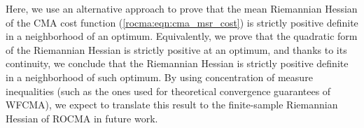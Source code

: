 %
%

Here, we use an alternative approach to prove that the mean Riemannian Hessian of the CMA cost function (\ref{rocma:eqn:cma_msr_cost}) is strictly positive definite in a neighborhood of an optimum. Equivalently, we prove that the quadratic form of the Riemannian Hessian is strictly positive at an optimum, and thanks to its continuity, we conclude that the Riemannian Hessian is strictly positive definite in a neighborhood of such optimum. By using concentration of measure inequalities (such as the ones used for theoretical convergence guarantees of WFCMA), we expect to translate this result to the finite-sample Riemannian Hessian of ROCMA in future work.

